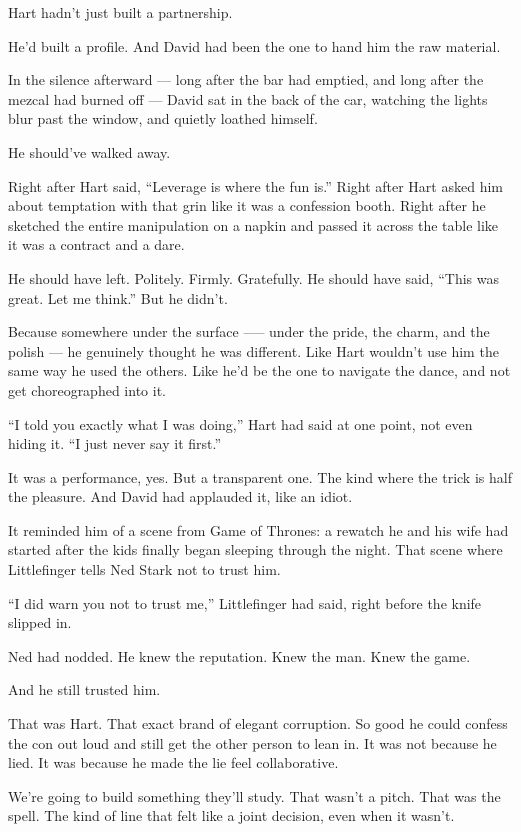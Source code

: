 Hart hadn’t just built a partnership.

He’d built a profile.
And David had been the one to hand him the raw material.

In the silence afterward --- long after the bar had emptied, and long after the mezcal had burned off --- David 
sat in the back of the car, watching the lights blur past the window, and quietly loathed himself.

He should’ve walked away.

Right after Hart said, ``Leverage is where the fun is.''
Right after Hart asked him about temptation with that grin like it was a confession booth.
Right after he sketched the entire manipulation on a napkin and passed it across the table like it was 
a contract and a dare.

He should have left. Politely. Firmly. Gratefully.
He should have said, ``This was great. Let me think.''
But he didn’t.

Because somewhere under the surface --— under the pride, the charm, and the polish --- he genuinely thought 
he was different.
Like Hart wouldn’t use him the same way he used the others.
Like he’d be the one to navigate the dance, and not get choreographed into it.

``I told you exactly what I was doing,'' Hart had said at one point, not even hiding it.
``I just never say it first.''

It was a performance, yes. But a transparent one. The kind where the trick is half the pleasure.
And David had applauded it, like an idiot.

It reminded him of a scene from Game of Thrones: a rewatch he and his wife had started after the kids 
finally began sleeping through the night.
That scene where Littlefinger tells Ned Stark not to trust him.

``I did warn you not to trust me,'' Littlefinger had said, right before the knife slipped in.

Ned had nodded. He knew the reputation. Knew the man. Knew the game.

And he still trusted him.

That was Hart. That exact brand of elegant corruption.
So good he could confess the con out loud and still get the other person to lean in.
It was not because he lied. It was because he made the lie feel collaborative.

We’re going to build something they’ll study.
That wasn’t a pitch. That was the spell.
The kind of line that felt like a joint decision, even when it wasn’t.

